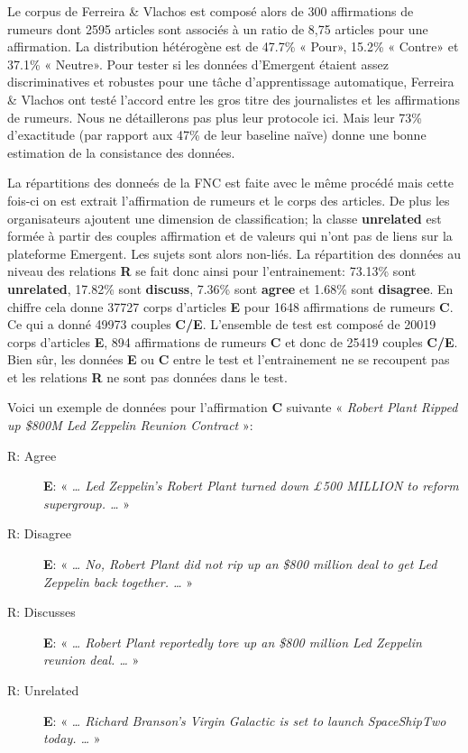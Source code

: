 \documentclass[11pt,a4paper,oldfontcommands]{memoir}
\begin{document}
Le corpus de Ferreira \& Vlachos est composé alors de 300 affirmations de rumeurs dont 2595 articles sont associés à un ratio de 8,75 articles pour une affirmation.
La distribution hétérogène  est de 47.7\% « Pour», 15.2\% « Contre» et 37.1\% « Neutre».
Pour tester si les données d'Emergent étaient assez discriminatives et robustes pour une tâche d'apprentissage automatique, Ferreira \& Vlachos ont testé l'accord entre les gros titre des journalistes et les affirmations de rumeurs.
Nous ne détaillerons pas plus leur protocole ici.
Mais leur 73\% d'exactitude (par rapport aux 47\% de leur baseline naïve) donne une bonne estimation de la consistance des données.

La répartitions des donneés de la FNC est faite avec le même procédé mais cette fois-ci on est extrait l'affirmation de rumeurs et le corps des articles.
De plus les organisateurs ajoutent une dimension de classification; la classe \textbf{unrelated}  est formée à partir des couples affirmation et de valeurs qui n'ont pas de liens sur la plateforme Emergent.
Les sujets sont alors non-liés.
La répartition des données au niveau des relations \textbf{R} se fait donc ainsi pour l'entrainement: 73.13\% sont \textbf{unrelated}, 17.82\% sont \textbf{discuss}, 7.36\% sont \textbf{agree} et 1.68\% sont \textbf{disagree}.
En chiffre cela donne 37727 corps d'articles \textbf{E} pour 1648 affirmations de rumeurs \textbf{C}.
Ce qui a donné 49973 couples \textbf{C/E}.
L'ensemble de test est composé de 20019 corps d'articles \textbf{E}, 894 affirmations de rumeurs \textbf{C} et donc de 25419 couples \textbf{C/E}.
Bien sûr, les données \textbf{E} ou \textbf{C} entre le test et l'entrainement ne se recoupent pas et les relations \textbf{R} ne sont pas données dans le test.

Voici un exemple de données pour l'affirmation \textbf{C} suivante « \textit{Robert Plant Ripped up \$800M Led Zeppelin Reunion Contract} »:

\begin{description}
 \item [R: Agree] \textbf{E}: « \textit{ … Led Zeppelin’s Robert Plant turned down £500 MILLION to reform supergroup.
        … } »
 \item [R: Disagree] \textbf{E}: « \textit{ … No, Robert Plant did not rip up an \$800 million deal to get Led Zeppelin back together.
        … } »
 \item [R: Discusses] \textbf{E}: « \textit{ … Robert Plant reportedly tore up an \$800 million Led Zeppelin reunion deal.
        … } »
 \item [R: Unrelated] \textbf{E}: « \textit{ … Richard Branson’s Virgin Galactic is set to launch SpaceShipTwo today.
        …} »
\end{description}
\end{document}

